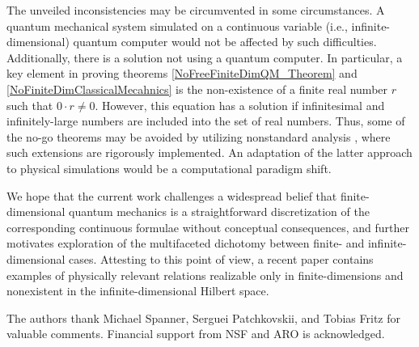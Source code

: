 \documentclass[twocolumn,pra,aps,showpacs,preprintnumbers,nofootinbib, superscriptaddress, amsmath,amssymb]{revtex4}
\begin{document}
The unveiled inconsistencies may be circumvented in some circumstances. A quantum mechanical system simulated on a continuous variable (i.e., infinite-dimensional) quantum computer \cite{braunstein2010quantum} would not be affected by such difficulties. Additionally, there is a solution not using a quantum computer. In particular, a key element in proving theorems \ref{NoFreeFiniteDimQM_Theorem} and \ref{NoFiniteDimClassicalMecahnics} is the non-existence of a finite real number $r$ such that $0\cdot r \neq 0$. However, this equation has a solution if infinitesimal and infinitely-large numbers are included into the set of real numbers. Thus, some of the no-go theorems may be avoided by utilizing nonstandard analysis \cite{robert2003nonstandard, Almeida2004}, where such extensions are rigorously implemented. An adaptation of the latter approach to physical simulations would be a computational paradigm shift.

We hope that the current work challenges a widespread belief that finite-dimensional quantum mechanics is a straightforward discretization of the corresponding continuous formulae without conceptual consequences, and further motivates exploration of the multifaceted dichotomy between finite- and infinite-dimensional cases. Attesting to this point of view, a recent paper \cite{Fritz2012} contains examples of physically relevant relations realizable only in finite-dimensions and nonexistent in the infinite-dimensional Hilbert space.

\acknowledgments The authors thank Michael Spanner, Serguei Patchkovskii, and Tobias Fritz for valuable comments. Financial support from NSF and ARO is acknowledged.


\end{document}
